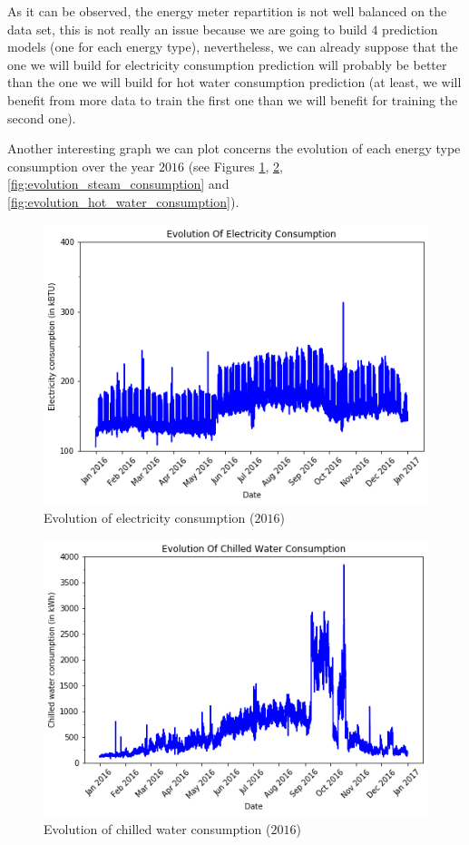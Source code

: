 \documentclass[twocolumn, switch]{article}
\begin{document}
As it can be observed, the energy meter repartition is not well balanced on the data set, this is not really an issue because we are going to build $4$ prediction models (one for each energy type), nevertheless, we can already suppose that the one we will build for electricity consumption prediction will probably be better than the one we will build for hot water consumption prediction (at least, we will benefit from more data to train the first one than we will benefit for training the second one).

Another interesting graph we can plot concerns the evolution of each energy type consumption over the year $2016$ (see Figures \ref{fig:evolution_electricity_consumption}, \ref{fig:evolution_chilled_water_consumption}, \ref{fig:evolution_steam_consumption} and \ref{fig:evolution_hot_water_consumption}).

\begin{figure}[H]
\centering
\includegraphics[scale=0.35]{../graphs/evolution_electricity_consumption}
\caption{Evolution of electricity consumption ($2016$)}
\label{fig:evolution_electricity_consumption}
\end{figure}

\begin{figure}[H]
\centering
\includegraphics[scale=0.35]{../graphs/evolution_chilled_water_consumption}
\caption{Evolution of chilled water consumption ($2016$)}
\label{fig:evolution_chilled_water_consumption}
\end{figure}
\end{document}
